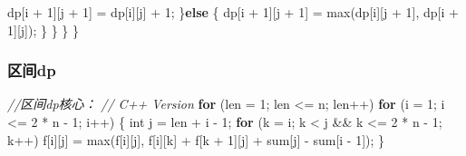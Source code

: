 \documentclass[
]{article}
\newenvironment{Shaded}{}{}
\newcommand{\CommentTok}[1]{\textcolor[rgb]{0.38,0.63,0.69}{\textit{#1}}}
\newcommand{\ControlFlowTok}[1]{\textcolor[rgb]{0.00,0.44,0.13}{\textbf{#1}}}
\newcommand{\DataTypeTok}[1]{\textcolor[rgb]{0.56,0.13,0.00}{#1}}
\newcommand{\DecValTok}[1]{\textcolor[rgb]{0.25,0.63,0.44}{#1}}
\newcommand{\NormalTok}[1]{#1}
\newcommand{\OperatorTok}[1]{\textcolor[rgb]{0.40,0.40,0.40}{#1}}
\begin{document}
\begin{Shaded}
\begin{Highlighting}[]
\NormalTok{                dp}\OperatorTok{[}\NormalTok{i }\OperatorTok{+} \DecValTok{1}\OperatorTok{][}\NormalTok{j }\OperatorTok{+} \DecValTok{1}\OperatorTok{]} \OperatorTok{=}\NormalTok{ dp}\OperatorTok{[}\NormalTok{i}\OperatorTok{][}\NormalTok{j}\OperatorTok{]} \OperatorTok{+} \DecValTok{1}\OperatorTok{;}  
            \OperatorTok{\}}\ControlFlowTok{else} \OperatorTok{\{}  
\NormalTok{                dp}\OperatorTok{[}\NormalTok{i }\OperatorTok{+} \DecValTok{1}\OperatorTok{][}\NormalTok{j }\OperatorTok{+} \DecValTok{1}\OperatorTok{]} \OperatorTok{=}\NormalTok{ max}\OperatorTok{(}\NormalTok{dp}\OperatorTok{[}\NormalTok{i}\OperatorTok{][}\NormalTok{j }\OperatorTok{+} \DecValTok{1}\OperatorTok{],}\NormalTok{ dp}\OperatorTok{[}\NormalTok{i }\OperatorTok{+} \DecValTok{1}\OperatorTok{][}\NormalTok{j}\OperatorTok{]);}  
            \OperatorTok{\}} \OperatorTok{\}} \OperatorTok{\}}
\OperatorTok{\}}  
\end{Highlighting}
\end{Shaded}

\hypertarget{ux533aux95f4dp}{%
\subsubsection{区间dp}\label{ux533aux95f4dp}}

\begin{Shaded}
\begin{Highlighting}[]
\CommentTok{//区间dp核心：}
\CommentTok{// C++ Version}
\ControlFlowTok{for} \OperatorTok{(}\NormalTok{len }\OperatorTok{=} \DecValTok{1}\OperatorTok{;}\NormalTok{ len }\OperatorTok{\textless{}=}\NormalTok{ n}\OperatorTok{;}\NormalTok{ len}\OperatorTok{++)}
  \ControlFlowTok{for} \OperatorTok{(}\NormalTok{i }\OperatorTok{=} \DecValTok{1}\OperatorTok{;}\NormalTok{ i }\OperatorTok{\textless{}=} \DecValTok{2} \OperatorTok{*}\NormalTok{ n }\OperatorTok{{-}} \DecValTok{1}\OperatorTok{;}\NormalTok{ i}\OperatorTok{++)} \OperatorTok{\{}
    \DataTypeTok{int}\NormalTok{ j }\OperatorTok{=}\NormalTok{ len }\OperatorTok{+}\NormalTok{ i }\OperatorTok{{-}} \DecValTok{1}\OperatorTok{;}
    \ControlFlowTok{for} \OperatorTok{(}\NormalTok{k }\OperatorTok{=}\NormalTok{ i}\OperatorTok{;}\NormalTok{ k }\OperatorTok{\textless{}}\NormalTok{ j }\OperatorTok{\&\&}\NormalTok{ k }\OperatorTok{\textless{}=} \DecValTok{2} \OperatorTok{*}\NormalTok{ n }\OperatorTok{{-}} \DecValTok{1}\OperatorTok{;}\NormalTok{ k}\OperatorTok{++)}
\NormalTok{      f}\OperatorTok{[}\NormalTok{i}\OperatorTok{][}\NormalTok{j}\OperatorTok{]} \OperatorTok{=}\NormalTok{ max}\OperatorTok{(}\NormalTok{f}\OperatorTok{[}\NormalTok{i}\OperatorTok{][}\NormalTok{j}\OperatorTok{],}\NormalTok{ f}\OperatorTok{[}\NormalTok{i}\OperatorTok{][}\NormalTok{k}\OperatorTok{]} \OperatorTok{+}\NormalTok{ f}\OperatorTok{[}\NormalTok{k }\OperatorTok{+} \DecValTok{1}\OperatorTok{][}\NormalTok{j}\OperatorTok{]} \OperatorTok{+}\NormalTok{ sum}\OperatorTok{[}\NormalTok{j}\OperatorTok{]} \OperatorTok{{-}}\NormalTok{ sum}\OperatorTok{[}\NormalTok{i }\OperatorTok{{-}} \DecValTok{1}\OperatorTok{]);}
  \OperatorTok{\}}
\end{Highlighting}
\end{Shaded}
\end{document}
